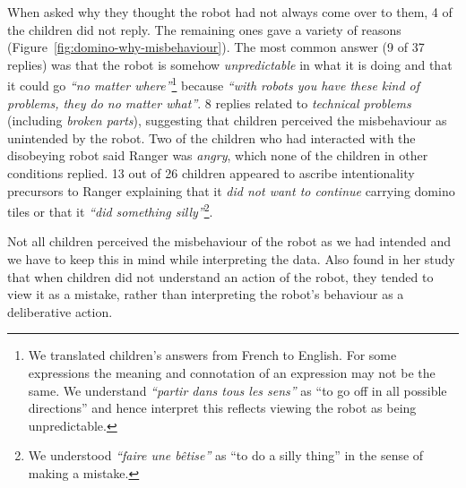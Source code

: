 \documentclass[letterpaper, 10pt, conference]{ieeeconf}
\newcommand{\eg}{{\textit{e.g.~}}}
\begin{document}
When asked why they thought the robot had not always come over to them, 4 of the
children did not reply. The remaining ones gave a variety of reasons
(Figure~\ref{fig:domino-why-misbehaviour}). The most common answer (9 of 37
replies) was that the robot is somehow \textit{unpredictable} in what it is
doing and that it could go \textit{``no matter where''}\footnote{We translated
children's answers from French to English. For some expressions the meaning
and connotation of an expression may not be the same. We understand
\textit{``partir dans tous les sens''} as ``to go off in all possible
directions'' and hence interpret this reflects viewing the robot as being
unpredictable.} because \textit{``with robots you have these kind of problems,
they do no matter what''}. 8 replies related to \textit{technical problems}
(including \textit{broken parts}), suggesting that children perceived the
misbehaviour as unintended by the robot. Two of the children who had interacted
with the disobeying robot said Ranger was \textit{angry}, which none of the
children in other conditions replied. 13 out of 26 children appeared to ascribe
intentionality precursors to Ranger explaining that it \textit{did not want to
continue} carrying domino tiles or that it \textit{``did something
silly''}\footnote{We understood \textit{``faire une bêtise''} as ``to do a silly
thing'' in the sense of making a mistake.}.

Not all children perceived the misbehaviour of the robot as we had intended and
we have to keep this in mind while interpreting the data. Also
\cite{leite_long-term_2013} found in her study that when children did not
understand an action of the robot, they tended to view it as a mistake, rather
than interpreting the robot's behaviour as a deliberative action.


\end{document}
